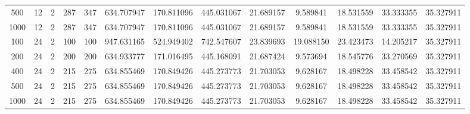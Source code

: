 \begin{table}[h]
\begin{tabular}{ccccccccccccc}
500 & 12 & 2 & 287 & 347 & 634.707947 & 170.811096 & 445.031067 & 21.689157 & 9.589841 & 18.531559 & 33.333355 & 35.327911 \\
1000 & 12 & 2 & 287 & 347 & 634.707947 & 170.811096 & 445.031067 & 21.689157 & 9.589841 & 18.531559 & 33.333355 & 35.327911 \\
100 & 24 & 2 & 100 & 100 & 947.631165 & 524.949402 & 742.547607 & 23.839693 & 19.088150 & 23.423473 & 14.205217 & 35.327911 \\
200 & 24 & 2 & 200 & 200 & 634.933777 & 171.016495 & 445.168091 & 21.687424 & 9.573694 & 18.545776 & 33.270569 & 35.327911 \\
400 & 24 & 2 & 215 & 275 & 634.855469 & 170.849426 & 445.273773 & 21.703053 & 9.628167 & 18.498228 & 33.458542 & 35.327911 \\
500 & 24 & 2 & 215 & 275 & 634.855469 & 170.849426 & 445.273773 & 21.703053 & 9.628167 & 18.498228 & 33.458542 & 35.327911 \\
1000 & 24 & 2 & 215 & 275 & 634.855469 & 170.849426 & 445.273773 & 21.703053 & 9.628167 & 18.498228 & 33.458542 & 35.327911 \\
\bottomrule
\end{tabular}
\end{table}
